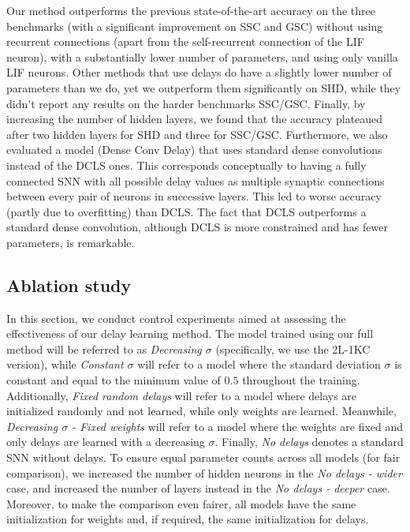 \documentclass{article} \usepackage{iclr2024_conference,times}
\begin{document}
Our method outperforms the previous state-of-the-art accuracy on the three benchmarks (with a significant improvement on SSC and GSC) without using recurrent connections (apart from the self-recurrent connection of the LIF neuron), with a substantially lower number of parameters, and using only vanilla LIF neurons. Other methods that use delays do have a slightly lower number of parameters than we do, yet we outperform them significantly on SHD, while they didn't report any results on the harder benchmarks SSC/GSC. Finally, by increasing the number of hidden layers, we found that the accuracy plateaued after two hidden layers for SHD and three for SSC/GSC.
Furthermore, we also evaluated a model (Dense Conv Delay) that uses standard dense convolutions instead of the DCLS ones. This corresponds conceptually to having a fully connected SNN with all possible delay values as multiple synaptic connections between every pair of neurons in successive layers. This led to worse accuracy (partly due to overfitting) than DCLS. The fact that DCLS outperforms a standard dense convolution, although DCLS is more constrained and has fewer parameters, is remarkable. 


\subsection{Ablation study}
\label{sec:ablation}

In this section, we conduct control experiments aimed at assessing the effectiveness of our delay learning method. The model trained using our full method will be referred to as \emph{Decreasing $\sigma$} (specifically, we use the 2L-1KC version), while \emph{Constant $\sigma$} will refer to a model where the standard deviation $\sigma$ is constant and equal to the minimum value of $0.5$ throughout the training. Additionally, \emph{Fixed random delays} will refer to a model where delays are initialized randomly and not learned, while only weights are learned. Meanwhile, \emph{Decreasing $\sigma$ - Fixed weights} will refer to a model where the weights are fixed and only delays are learned with a decreasing $\sigma$. Finally, \emph{No delays} denotes a standard SNN without delays. To ensure equal parameter counts across all models (for fair comparison), we increased the number of hidden neurons in the \emph{No delays - wider} case, and increased the number of layers instead in the \emph{No delays - deeper} case. Moreover, to make the comparison even fairer, all models have the same initialization for weights and, if required, the same initialization for delays.
\end{document}
